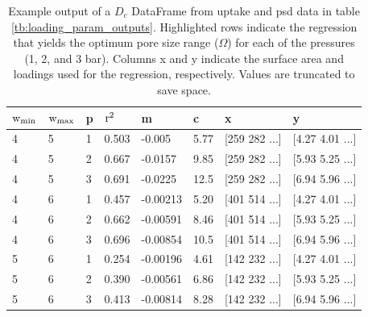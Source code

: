 \begin{table}[h!]
    \centering
    \begin{tabular}{l|l|l|l|l|l|l|l}
        $\rm w_{min}$ & $\rm w_{max}$ & p & $\rm r^2$ & m & c & x & y \\
        \midrule
        \rowcolor{yellow} 4 & 5 & 1 & 0.503 & -0.005 & 5.77 & [259 282 ...] & [4.27 4.01 ...] \\
        \rowcolor{yellow} 4 & 5 & 2 & 0.667 & -0.0157	& 9.85 & [259 282 ...] & [5.93 5.25 ...] \\
        4 & 5 & 3 & 0.691 & -0.0225 & 12.5 & [259 282 ...] & [6.94 5.96 ...] \\
        4 & 6 & 1 & 0.457 & -0.00213 & 5.20 & [401 514 ...] & [4.27 4.01 ...] \\
        4 &	6 & 2 & 0.662 & -0.00591 & 8.46	& [401 514 ...] & [5.93 5.25 ...] \\
        \rowcolor{yellow} 4 &	6 & 3 &	0.696 & -0.00854 & 10.5 & [401 514 ...] & [6.94 5.96 ...] \\
        5 & 6 & 1 & 0.254 & -0.00196 & 4.61 & [142 232 ...] & [4.27 4.01 ...] \\
        5 & 6 & 2 & 0.390 & -0.00561 & 6.86 & [142 232 ...] & [5.93 5.25 ...] \\
        5 & 6 & 3 & 0.413 & -0.00814 & 8.28 & [142 232 ...] & [6.94 5.96 ...] \\
    \end{tabular}
    \caption{Example output of a $D_c$ DataFrame from  uptake and \acrshort{psd} data in table \ref{tb:loading_param_outputs}. Highlighted rows indicate the regression that yields the optimum pore size range ($\Omega$) for each of the pressures (1, 2, and 3 bar). Columns x and y indicate the surface area and loadings used for the regression, respectively. Values are truncated to save space.}
    \label{tb:D_c}
\end{table}


